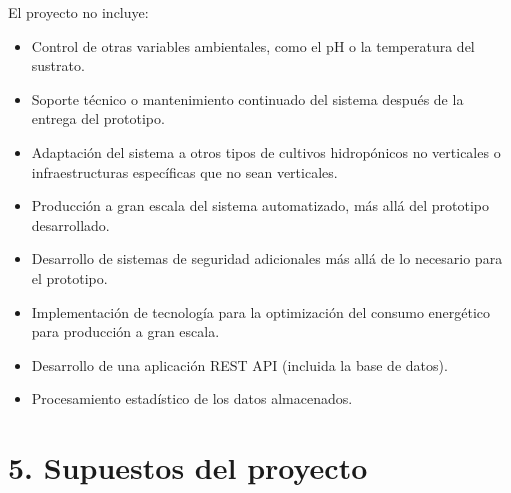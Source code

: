 \documentclass[
11pt, %
]{charter}
\begin{document}
El proyecto no incluye:
\begin{itemize}
	\item Control de otras variables ambientales, como el pH o la temperatura del sustrato.
	\item Soporte técnico o mantenimiento continuado del sistema después de la entrega del prototipo.
	\item Adaptación del sistema a otros tipos de cultivos hidropónicos no verticales o infraestructuras específicas que no sean verticales.
	\item Producción a gran escala del sistema automatizado, más allá del prototipo desarrollado.
	\item Desarrollo de sistemas de seguridad adicionales más allá de lo necesario para el prototipo.
	\item Implementación de tecnología para la optimización del consumo energético para producción a gran escala.
	\item Desarrollo de una aplicación REST API (incluida la base de datos).
	\item Procesamiento estadístico de los datos almacenados.
	
\end{itemize}




\section{5. Supuestos del proyecto}
\label{sec:supuestos}

\end{document}
